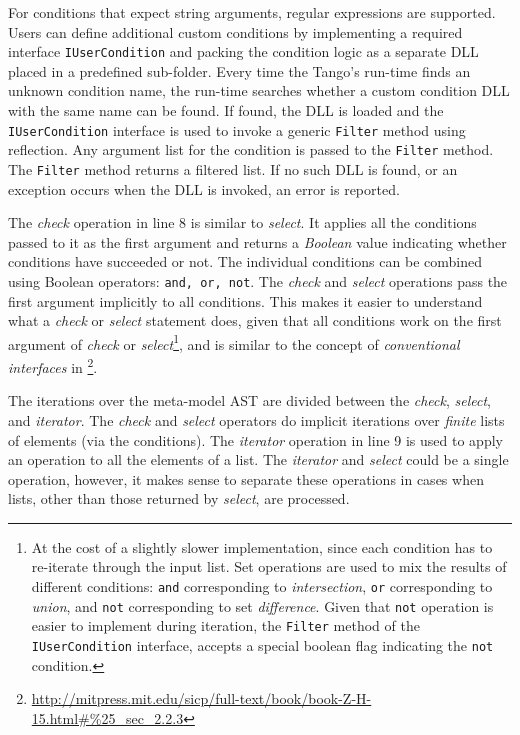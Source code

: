 For conditions that expect string arguments, regular expressions are supported. Users can define additional custom conditions by implementing a required interface \texttt{IUser\-Con\-di\-tion} and packing the condition logic as a separate DLL placed in a predefined sub-folder. Every time the Tango's run-time finds an unknown condition name, the run-time searches whether a custom condition DLL with the same name can be found. If found, the DLL is loaded and the \texttt{IUser\-Con\-di\-tion} interface is used to invoke a generic {\tt Fil\-ter} method using reflection. Any argument list for the condition is passed to the {\tt Fil\-ter} method. The {\tt Fil\-ter} method returns a filtered list. If no such DLL is found, or an exception occurs when the DLL is invoked, an error is reported.

The \textit{check} operation in line 8 is similar to \textit{select}. It applies all the conditions passed to it as the first argument and returns a \textit{Boolean} value indicating whether conditions have succeeded or not. The individual conditions can be combined using Boolean operators: {\tt and, or, not}. The \textit{check} and \textit{select} operations pass the first argument implicitly to all conditions. This makes it easier to understand what a \textit{check} or \textit{select} statement does, given that all conditions work on the first argument of \textit{check} or \textit{select}\footnote{At the cost of a slightly slower implementation, since each condition has to re-iterate through the input list. Set operations are used to mix the results of different conditions: \texttt{and} corresponding to \textit{intersection}, \texttt{or} corresponding to \textit{union}, and \texttt{not} corresponding to set \textit{difference}. Given that \texttt{not} operation is easier to implement during iteration, the \texttt{Fil\-ter} method of the \texttt{IUser\-Condi\-tion} interface, accepts a special boolean flag indicating the \texttt{not} condition.}, and is similar to the concept of \textit{conventional interfaces} in \cite{sicp.96}\footnote{\url{http://mitpress.mit.edu/sicp/full-text/book/book-Z-H-15.html\#\%25_sec_2.2.3}}.

The iterations over the meta-model AST are divided between the \textit{check}, \textit{select}, and \textit{iterator}. The \textit{check} and \textit{select} operators do implicit iterations over \textit{finite} lists of elements (via the conditions). The \textit{iterator} operation in line 9 is used to apply an operation to all the elements of a list. The \textit{iterator} and \textit{select} could be a single operation, however, it makes sense to separate these operations in cases when lists, other than those returned by \textit{select}, are processed. 

